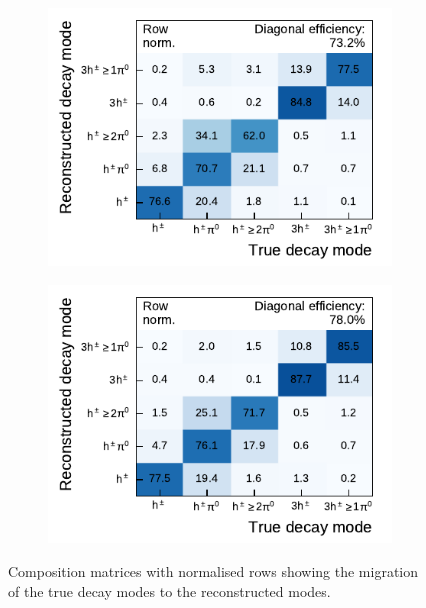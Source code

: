\begin{figure}[ht]
  \begin{subfigure}[t]{0.48\textwidth}
    \centering
    \includegraphics{./figures/decay_mode_classification/comp_mat_pantau.pdf}
  \end{subfigure}\hfill
  \begin{subfigure}[t]{0.48\textwidth}
    \centering
    \includegraphics{./figures/decay_mode_classification/comp_mat_baseline_ptcut_1_5.pdf}
  \end{subfigure}
  \caption{Composition matrices with normalised rows showing the migration of
    the true decay modes to the reconstructed modes.}
  \label{fig:migmat}
\end{figure}


